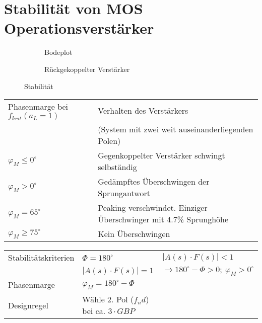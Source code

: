 \section{Stabilität von MOS Operationsverstärker}
\begin{figure}[!h]
	\centering
	\begin{subfigure}[b]{10cm}
		\centering
		{}
		\caption{Bodeplot}
	\end{subfigure}\qquad
	\begin{subfigure}[b]{8cm}
		\centering
		{}
		\caption{Rückgekoppelter Verstärker}
	\end{subfigure}
	\caption{Stabilität}
	\label{fig:stabilitaet}
\end{figure}

\begin{tabular}{|l|l|}
\hline
	Phasenmarge bei $f_{krit}(a_L=1)$ &
	Verhalten des Verstärkers \\
	& (System mit zwei weit auseinanderliegenden Polen) \\\hline
	$\varphi_M \leq 0^\circ$ & 
	Gegenkoppelter Verstärker schwingt selbständig \\\hline
	$\varphi_M > 0^\circ$ &
	Gedämpftes Überschwingen der Sprungantwort \\\hline
	$\varphi_M = 65^\circ$ &
	Peaking verschwindet. Einziger Überschwinger mit 4.7\% Sprunghöhe \\\hline
	$\varphi_M \geq 75^\circ$ &
	Kein Überschwingen \\\hline
\end{tabular}

\begin{tabular}{lll}
Stabilitätskriterien & $\Phi = 180^\circ$ & $ \left|A(s)\cdot F(s)\right|<1 $ \\
& $ \left|A(s)\cdot F(s)\right|= 1 $ & $ \rightarrow 180^\circ-\Phi>0;\
\varphi_M>0^\circ $ \\
Phasenmarge & $\varphi_M=180^\circ-\Phi $ & \\
Designregel & Wähle 2. Pol ($f_nd$) bei ca. $3\cdot GBP$& \\
\end{tabular}